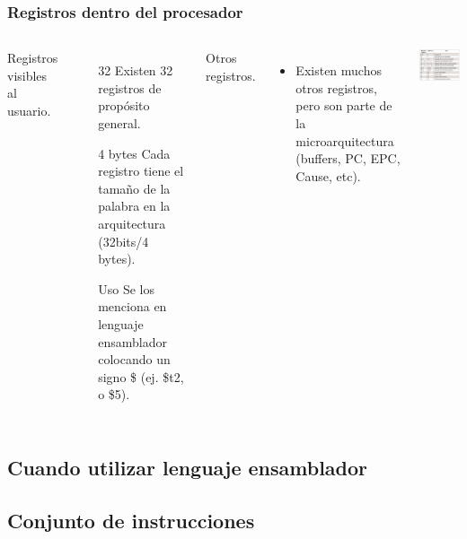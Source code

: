 \documentclass[aspectratio=169,compress]{beamer}
\begin{document}
\begin{footnotesize}
\begin{frame}
\frametitle{Registros dentro del procesador}
 \begin{columns}[onlytextwidth,T]
      \column{\dimexpr\linewidth-60mm-5mm}

Registros visibles al usuario.
        \begin{itemize}
\bigskip
  \item[32] Existen 32 registros de propósito general.
  \item[4 bytes] Cada registro tiene el tamaño de la palabra en la arquitectura (32bits/4 bytes).
  \item[Uso] Se los menciona en lenguaje ensamblador colocando un signo \$ (ej. \$t2, o \$5).

        \end{itemize}

Otros registros.
        \begin{itemize}
  \item Existen muchos otros registros, pero son parte de la microarquitectura (buffers, PC, EPC, Cause, etc).
        \end{itemize}
      \column{60mm}
    \includegraphics[width=65mm]{images/convencion.jpg}

    \end{columns}


\end{frame}

\subsection{Cuando utilizar lenguaje ensamblador}

\subsection{Conjunto de instrucciones}



\end{footnotesize}
\end{document}
